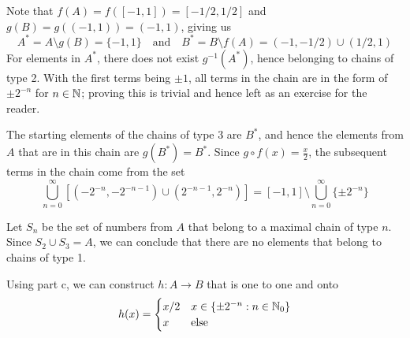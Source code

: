 {{{            \item Note that $f(A) = f( [-1, 1] ) = [-1/2, 1/2]$ and $g(B) = g( (-1, 1) ) = (-1, 1)$, giving us 
            \[
            A^* = A \setminus g(B) = \{ -1,  1\}
            \quad
            \text{and}
            \quad
            B^* = B \setminus f(A) = (-1, -1/2) \cup (1/2, 1)
            \]
            For elements in $A^*$, there does not exist $g^{-1}(A^*)$, hence belonging to chains of type 2. 
            With the first terms being $\pm 1$, all terms in the chain are in the form of $\pm 2^{-n}$ for $n \in \mathbb N$; proving this is trivial and hence left as an exercise for the reader.

            The starting elements of the chains of type 3 are $B^*$, and hence the elements from $A$ that are in this chain are $g(B^*) = B^*$. Since $g \circ f (x)  = \frac x2$, the subsequent terms in the chain come from the set 
            \[
            \bigcup_{n=0}^\infty [(-2^{-n}, -2^{-n-1}) \cup (2^{-n-1}, 2^{-n})] = [-1,1] \setminus \bigcup_{n=0}^\infty \{ \pm 2^{-n} \}
            \]

            Let $S_n$ be the set of numbers from $A$ that belong to a maximal chain of type $n$. Since $S_2 \cup S_3 = A$, we can conclude that there are no elements that belong to chains of type 1.

            Using part c, we can construct $h : A \rightarrow B$ that is one to one and onto 
            \[
            h(x) = 
            \begin{cases}
            x/2 & x \in \{ \pm 2^{-n} : n \in \mathbb N_0\} \\
            x & \text{else} 
            \end{cases}
            \]

        }
    }
}

